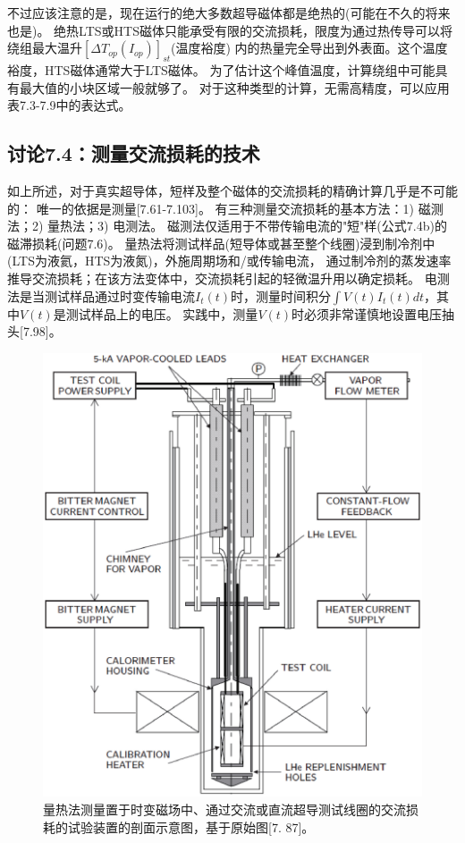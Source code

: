 不过应该注意的是，现在运行的绝大多数超导磁体都是绝热的(可能在不久的将来也是)。
绝热LTS或HTS磁体只能承受有限的交流损耗，限度为通过热传导可以将绕组最大温升$[\Delta T_{op}(I_{op})]_{st}$(温度裕度)
内的热量完全导出到外表面。这个温度裕度，HTS磁体通常大于LTS磁体。
为了估计这个峰值温度，计算绕组中可能具有最大值的小块区域一般就够了。
对于这种类型的计算，无需高精度，可以应用表7.3-7.9中的表达式。


\subsection{讨论7.4：测量交流损耗的技术}
如上所述，对于真实超导体，短样及整个磁体的交流损耗的精确计算几乎是不可能的：
唯一的依据是测量[7.61-7.103]。
有三种测量交流损耗的基本方法：1) 磁测法；2) 量热法；3) 电测法。
磁测法仅适用于不带传输电流的"短"样(公式7.4b)的磁滞损耗(问题7.6)。
量热法将测试样品(短导体或甚至整个线圈)浸到制冷剂中(LTS为液氦，HTS为液氮)，外施周期场和/或传输电流，
通过制冷剂的蒸发速率推导交流损耗；在该方法变体中，交流损耗引起的轻微温升用以确定损耗。
电测法是当测试样品通过时变传输电流$I_t(t)$时，测量时间积分$\int V(t)I_t(t)dt$，其中$V(t)$是测试样品上的电压。
实践中，测量$V(t)$时必须非常谨慎地设置电压抽头[7.98]。

\begin{figure}[htbp]
	\centering
	\includegraphics[scale=0.7]{chpt7/figs/fig7.19.eps}
	\caption{量热法测量置于时变磁场中、通过交流或直流超导测试线圈的交流损耗的试验装置的剖面示意图，基于原始图[7.
		87]。}
\end{figure}

